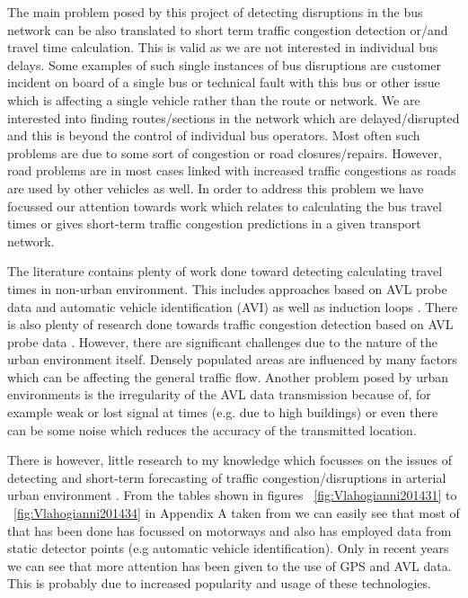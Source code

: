 The main problem posed by this project of detecting disruptions in the bus network can be also translated to short term traffic congestion detection or/and travel time calculation. This is valid as we are not interested in individual bus delays. Some examples of such single instances of bus disruptions are customer incident on board of a single bus or technical fault with this bus or other issue which is affecting a single vehicle rather than the route or network. We are interested into finding routes/sections in the network which are delayed/disrupted and this is beyond the control of individual bus operators. Most often such problems are due to some sort of congestion or road closures/repairs. However, road problems are in most cases linked with increased traffic congestions as roads are used by other vehicles as well. In order to address this problem we have focussed our attention towards work which relates to calculating the bus travel times or gives short-term traffic congestion predictions in a given transport network.

The literature contains plenty of work done toward detecting calculating travel times in non-urban environment. This includes approaches based on AVL probe data and automatic vehicle identification (AVI) as well as induction loops \cite{Vlahogianni20143}. There is also plenty of research done towards traffic congestion detection based on AVL probe data \cite{Vlahogianni20143}. However, there are significant challenges due to the nature of the urban environment itself. Densely populated areas are influenced by many factors which can be affecting the general traffic flow. Another problem posed by urban environments is the irregularity of the AVL data transmission because of, for example weak or lost signal at times (e.g. due to high buildings) or even there can be some noise which reduces the accuracy of the transmitted location. 

There is however, little research to my knowledge which focusses on the issues of detecting and short-term forecasting of traffic congestion/disruptions in arterial urban environment  \cite{Vlahogianni20143} \cite{5625144}. From the tables shown in figures ~\ref{fig:Vlahogianni201431} to ~\ref{fig:Vlahogianni201434} in Appendix A taken from \cite{Vlahogianni20143} we can easily see that most of that has been done has focussed on motorways and also has employed data from static detector points (e.g automatic vehicle identification). Only in recent years we can see that more attention has been given to the use of GPS and AVL data. This is probably due to increased popularity and usage of these technologies.

